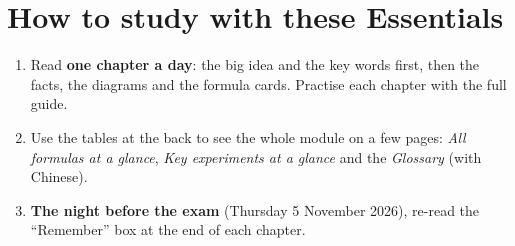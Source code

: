 \documentclass[11pt,a4paper,oneside,openany]{book}
\begin{document}
\section*{How to study with these Essentials}

\begin{enumerate}
  \item Read \textbf{one chapter a day}: the big idea and the key words first, then the facts,
        the diagrams and the formula cards. Practise each chapter with the full guide.
  \item Use the tables at the back to see the whole module on a few pages: \emph{All formulas
        at a glance}, \emph{Key experiments at a glance} and the \emph{Glossary} (with Chinese).
  \item \textbf{The night before the exam} (Thursday 5 November 2026), re-read the
        ``Remember'' box at the end of each chapter.
\end{enumerate}

{\setlength\parskip{0pt plus 1pt}\tableofcontents}


\end{document}
